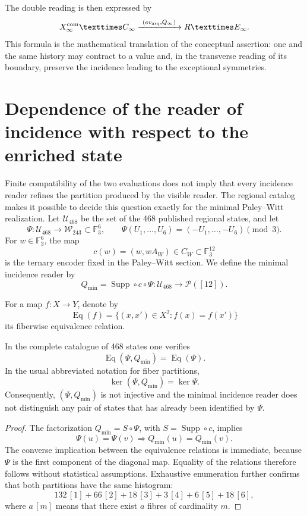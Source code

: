 The double reading is then expressed by
\[
 X_\infty^{\rm com}\times C_\infty
 \xrightarrow{\ (\operatorname{ev}_{\rm arq},Q_\infty)\ }
 \mathbb R\times E_\infty.
\]
This formula is the mathematical translation of the conceptual assertion: one
and the same history may contract to a value and, in the transverse reading
of its boundary, preserve the incidence leading to the exceptional
symmetries.


\section{Dependence of the reader of incidence with respect to the enriched state}
\label{p12-83-c17-s4:sec:obstruccion-lector-excepcional-minimo}

Finite compatibility of the two evaluations does not imply that every
incidence reader refines the partition produced by the visible reader. The
regional catalog makes it possible to decide this question exactly for the
minimal Paley--Witt realization. Let \(\mathcal U_{468}\) be the set of
the 468 published regional states, and let
\[
 \Psi:\mathcal U_{468}\longrightarrow\mathcal W_{243}\subset\mathbb F_3^6,
 \qquad
 \Psi(U_1,\ldots,U_6)=(-U_1,\ldots,-U_6)\pmod 3.
\]
For \(w\in\mathbb F_3^6\), the map
\[
 c(w)=(w,wA_W)\in C_W\subset\mathbb F_3^{12}
\]
is the ternary encoder fixed in the Paley--Witt section. We define
the minimal incidence reader by
\[
 Q_{\min}=\operatorname{Supp}\circ c\circ\Psi:
 \mathcal U_{468}\longrightarrow\mathcal P([12]).
\]

For a map \(f:X\to Y\), denote by
\[
 \operatorname{Eq}(f)=\{(x,x')\in X^2:f(x)=f(x')\}
\]
its fiberwise equivalence relation.

\begin{theorem}
\label{p12-83-c17-s4:thm:obstruccion-lector-excepcional-minimo}
In the complete catalogue of 468 states one verifies
\[
 \operatorname{Eq}(\Psi,Q_{\min})=\operatorname{Eq}(\Psi).
\]
In the usual abbreviated notation for fiber partitions,
\[
 \ker(\Psi,Q_{\min})=\ker\Psi.
\]
Consequently, \((\Psi,Q_{\min})\) is not injective and the minimal
incidence reader does not distinguish any pair of states that has already been
identified by \(\Psi\).
\end{theorem}

\begin{proof}
The factorization \(Q_{\min}=S\circ\Psi\), with
\(S=\operatorname{Supp}\circ c\), implies
\[
 \Psi(u)=\Psi(v)\Longrightarrow Q_{\min}(u)=Q_{\min}(v).
\]
The converse implication between the equivalence relations is immediate,
because \(\Psi\) is the first component of the diagonal map. Equality of the
relations therefore follows without statistical assumptions. Exhaustive
enumeration further confirms that both partitions have the same
histogram:
\[
 132\,[1]+66\,[2]+18\,[3]+3\,[4]+6\,[5]+18\,[6],
\]
where \(a\,[m]\) means that there exist \(a\) fibres of cardinality \(m\).
\end{proof}

